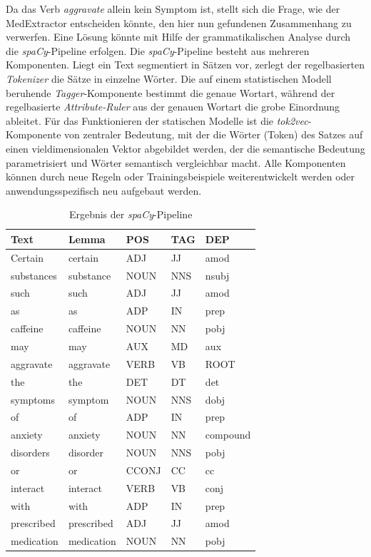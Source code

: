 Da das Verb \emph{aggravate} allein kein Symptom ist, stellt sich die Frage, wie der MedExtractor entscheiden könnte, den hier nun gefundenen Zusammenhang zu verwerfen. Eine Lösung könnte mit Hilfe der grammatikalischen Analyse durch die \emph{spaCy}-Pipeline erfolgen. Die \emph{spaCy}-Pipeline besteht aus mehreren Komponenten. Liegt ein Text segmentiert in Sätzen vor, zerlegt der regelbasierten \emph{Tokenizer} die Sätze in einzelne Wörter. Die auf einem statistischen Modell beruhende \emph{Tagger}-Komponente bestimmt die genaue Wortart, während der regelbasierte \emph{Attribute-Ruler} aus der genauen Wortart die grobe Einordnung ableitet. Für das Funktionieren der statischen Modelle ist die \emph{tok2vec}-Komponente von zentraler Bedeutung, mit der die Wörter (Token) des Satzes auf einen vieldimensionalen Vektor abgebildet werden, der die semantische Bedeutung parametrisiert und Wörter semantisch vergleichbar macht. Alle Komponenten können durch neue Regeln oder Trainingsbeispiele weiterentwickelt werden oder anwendungsspezifisch neu aufgebaut werden. 

\begin{table}
\centering
\begin{tabular}{lllll}
\hline
\textbf{Text}	& \textbf{Lemma}	& \textbf{POS} & \textbf{TAG} & \textbf{DEP} \\
\hline
Certain & certain & ADJ & JJ & amod \\
substances & substance & NOUN & NNS & nsubj \\
such & such & ADJ & JJ & amod \\
as & as & ADP & IN & prep \\
caffeine & caffeine & NOUN & NN & pobj \\
may & may & AUX & MD & aux \\
aggravate & aggravate & VERB & VB & ROOT \\
the & the & DET & DT & det \\
symptoms & symptom & NOUN & NNS & dobj \\
of & of & ADP & IN & prep \\
anxiety & anxiety & NOUN & NN & compound \\
disorders & disorder & NOUN & NNS & pobj \\
or & or & CCONJ & CC & cc \\
interact & interact & VERB & VB & conj \\
with & with & ADP & IN & prep \\
prescribed & prescribed & ADJ & JJ & amod \\
medication & medication & NOUN & NN & pobj \\
\hline
\end{tabular}
\caption{Ergebnis der \emph{spaCy}-Pipeline}
\label{tab:spaCy}
\end{table}

